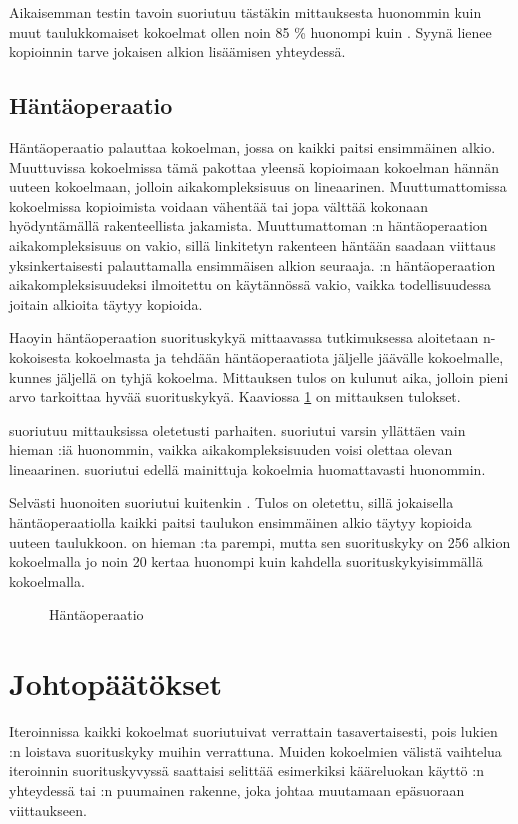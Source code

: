 Aikaisemman testin tavoin  suoriutuu tästäkin mittauksesta huonommin kuin muut taulukkomaiset kokoelmat ollen noin 85 \% huonompi kuin . Syynä lienee kopioinnin tarve jokaisen alkion lisäämisen yhteydessä.


\subsection{Häntäoperaatio}
Häntäoperaatio palauttaa kokoelman, jossa on kaikki paitsi ensimmäinen alkio. Muuttuvissa kokoelmissa tämä pakottaa yleensä kopioimaan kokoelman hännän uuteen kokoelmaan, jolloin aikakompleksisuus on lineaarinen. Muuttumattomissa kokoelmissa kopioimista voidaan vähentää tai jopa välttää kokonaan hyödyntämällä rakenteellista jakamista. Muuttumattoman :n häntäoperaation aikakompleksisuus on vakio, sillä linkitetyn rakenteen häntään saadaan viittaus yksinkertaisesti palauttamalla ensimmäisen alkion seuraaja. :n häntäoperaation aikakompleksisuudeksi ilmoitettu on käytännössä vakio\cite{scalaCollections}, vaikka todellisuudessa joitain alkioita täytyy kopioida.

Haoyin\cite{haoyiBenchmark} häntäoperaation suorituskykyä mittaavassa tutkimuksessa aloitetaan n-kokoisesta kokoelmasta ja tehdään häntäoperaatiota jäljelle jäävälle kokoelmalle, kunnes jäljellä on tyhjä kokoelma. Mittauksen tulos on kulunut aika, jolloin pieni arvo tarkoittaa hyvää suorituskykyä. Kaaviossa \ref{hantaoperaatio_kaavio} on mittauksen tulokset.

 suoriutuu mittauksissa oletetusti parhaiten.  suoriutui varsin yllättäen vain hieman :iä huonommin, vaikka aikakompleksisuuden voisi olettaa olevan lineaarinen.  suoriutui edellä mainittuja kokoelmia huomattavasti huonommin.

Selvästi huonoiten suoriutui kuitenkin . Tulos on oletettu, sillä jokaisella häntäoperaatiolla kaikki paitsi taulukon ensimmäinen alkio täytyy kopioida uuteen taulukkoon.  on hieman :ta parempi, mutta sen suorituskyky on 256 alkion kokoelmalla jo noin 20 kertaa huonompi kuin kahdella suorituskykyisimmällä kokoelmalla.

\begin{figure}[h]
    \centering
    
    \caption{Häntäoperaatio}\label{hantaoperaatio_kaavio}
\end{figure}


\section{Johtopäätökset}
Iteroinnissa kaikki kokoelmat suoriutuivat verrattain tasavertaisesti, pois lukien \\:n loistava suorituskyky muihin verrattuna. Muiden kokoelmien välistä vaihtelua iteroinnin suorituskyvyssä saattaisi selittää esimerkiksi kääreluokan käyttö :n yhteydessä tai :n puumainen rakenne, joka johtaa muutamaan epäsuoraan viittaukseen.

